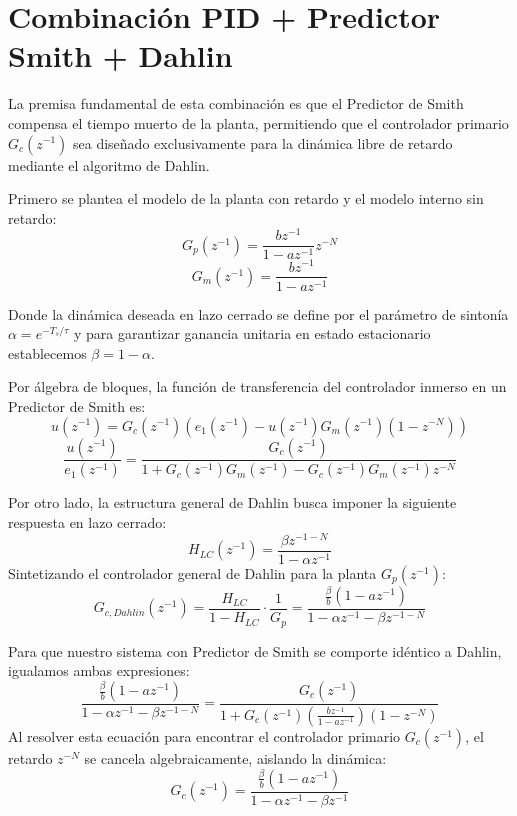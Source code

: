 \clearpage
\section{Combinación PID + Predictor Smith + Dahlin}

La premisa fundamental de esta combinación es que el Predictor de Smith compensa el tiempo muerto de la planta, permitiendo que el controlador primario $G_c(z^{-1})$ sea diseñado exclusivamente para la dinámica libre de retardo mediante el algoritmo de Dahlin.

Primero se plantea el modelo de la planta con retardo y el modelo interno sin retardo:
\begin{equation}
  G_p(z^{-1}) = \frac{bz^{-1}}{1-az^{-1}}z^{-N}
  \label{planta-ps}
\end{equation}
\begin{equation}
  G_m(z^{-1}) = \frac{bz^{-1}}{1-az^{-1}}
  \label{modelo-ps}
\end{equation}

Donde la dinámica deseada en lazo cerrado se define por el parámetro de sintonía $\alpha = e^{-T_s/\tau}$ y para garantizar ganancia unitaria en estado estacionario establecemos $\beta = 1 - \alpha$.

Por álgebra de bloques, la función de transferencia del controlador inmerso en un Predictor de Smith es:
\[
  u(z^{-1}) = G_c(z^{-1}) \left( e_1(z^{-1}) - u(z^{-1})G_m(z^{-1})(1 - z^{-N}) \right)
\]
\begin{equation}
  \frac{u(z^{-1})}{e_1(z^{-1})} = \frac{G_c(z^{-1})}{1 + G_c(z^{-1})G_m(z^{-1}) - G_c(z^{-1})G_m(z^{-1})z^{-N}}
  \label{GC_ps}
\end{equation}

Por otro lado, la estructura general de Dahlin busca imponer la siguiente respuesta en lazo cerrado:
\[
  H_{LC}(z^{-1}) = \frac{\beta z^{-1-N}}{1 - \alpha z^{-1}}
\]
Sintetizando el controlador general de Dahlin para la planta $G_p(z^{-1})$:
\[
  G_{c,Dahlin}(z^{-1}) = \frac{H_{LC}}{1 - H_{LC}}\cdot \frac{1}{G_p} = \frac{\frac{\beta}{b}(1 - az^{-1})}{1 - \alpha z^{-1} - \beta z^{-1-N}}
\]

Para que nuestro sistema con Predictor de Smith se comporte idéntico a Dahlin, igualamos ambas expresiones:
\[
  \frac{\frac{\beta}{b}(1 - az^{-1})}{1 - \alpha z^{-1} - \beta z^{-1-N}} =\frac{G_c(z^{-1})}{1 + G_c(z^{-1}) \left( \frac{bz^{-1}}{1-az^{-1}} \right) (1 - z^{-N})} 
\]
Al resolver esta ecuación para encontrar el controlador primario $G_c(z^{-1})$, el retardo $z^{-N}$ se cancela algebraicamente, aislando la dinámica:
\begin{equation}
  G_c(z^{-1}) = \frac{\frac{\beta}{b}(1 - az^{-1})}{1 - \alpha z^{-1} - \beta z^{-1}} 
  \label{controlador-ps}
\end{equation}

